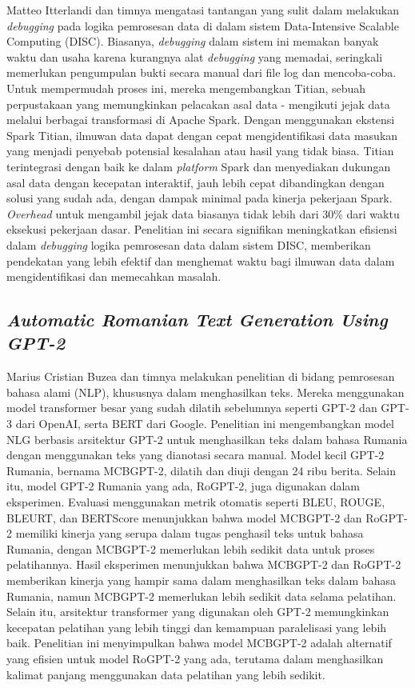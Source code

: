 Matteo Itterlandi dan timnya mengatasi tantangan yang sulit dalam melakukan \emph{debugging} pada logika pemrosesan data di dalam sistem Data-Intensive Scalable Computing (DISC). Biasanya, \emph{debugging} dalam sistem ini memakan banyak waktu dan usaha karena kurangnya alat \emph{debugging} yang memadai, seringkali memerlukan pengumpulan bukti secara manual dari file log dan mencoba-coba. Untuk mempermudah proses ini, mereka mengembangkan Titian, sebuah perpustakaan yang memungkinkan pelacakan asal data - mengikuti jejak data melalui berbagai transformasi di Apache Spark. Dengan menggunakan ekstensi Spark Titian, ilmuwan data dapat dengan cepat mengidentifikasi data masukan yang menjadi penyebab potensial kesalahan atau hasil yang tidak biasa. Titian terintegrasi dengan baik ke dalam \emph{platform} Spark dan menyediakan dukungan asal data dengan kecepatan interaktif, jauh lebih cepat dibandingkan dengan solusi yang sudah ada, dengan dampak minimal pada kinerja pekerjaan Spark. \emph{Overhead} untuk mengambil jejak data biasanya tidak lebih dari 30\% dari waktu eksekusi pekerjaan dasar. Penelitian ini secara signifikan meningkatkan efisiensi dalam \emph{debugging} logika pemrosesan data dalam sistem DISC, memberikan pendekatan yang lebih efektif dan menghemat waktu bagi ilmuwan data dalam mengidentifikasi dan memecahkan masalah.

\subsection{\emph{Automatic Romanian Text Generation Using GPT-2}}
\label{subsec:Automatic Romanian Text Generation Using GPT-2}

Marius Cristian Buzea dan timnya melakukan penelitian di bidang pemrosesan bahasa alami (NLP), khususnya dalam menghasilkan teks. Mereka menggunakan model transformer besar yang sudah dilatih sebelumnya seperti GPT-2 dan GPT-3 dari OpenAI, serta BERT dari Google. Penelitian ini mengembangkan model NLG berbasis arsitektur GPT-2 untuk menghasilkan teks dalam bahasa Rumania dengan menggunakan teks yang dianotasi secara manual. Model kecil GPT-2 Rumania, bernama MCBGPT-2, dilatih dan diuji dengan 24 ribu berita. Selain itu, model GPT-2 Rumania yang ada, RoGPT-2, juga digunakan dalam eksperimen. Evaluasi menggunakan metrik otomatis seperti BLEU, ROUGE, BLEURT, dan BERTScore menunjukkan bahwa model MCBGPT-2 dan RoGPT-2 memiliki kinerja yang serupa dalam tugas penghasil teks untuk bahasa Rumania, dengan MCBGPT-2 memerlukan lebih sedikit data untuk proses pelatihannya. Hasil eksperimen menunjukkan bahwa MCBGPT-2 dan RoGPT-2 memberikan kinerja yang hampir sama dalam menghasilkan teks dalam bahasa Rumania, namun MCBGPT-2 memerlukan lebih sedikit data selama pelatihan. Selain itu, arsitektur transformer yang digunakan oleh GPT-2 memungkinkan kecepatan pelatihan yang lebih tinggi dan kemampuan paralelisasi yang lebih baik. Penelitian ini menyimpulkan bahwa model MCBGPT-2 adalah alternatif yang efisien untuk model RoGPT-2 yang ada, terutama dalam menghasilkan kalimat panjang menggunakan data pelatihan yang lebih sedikit.

